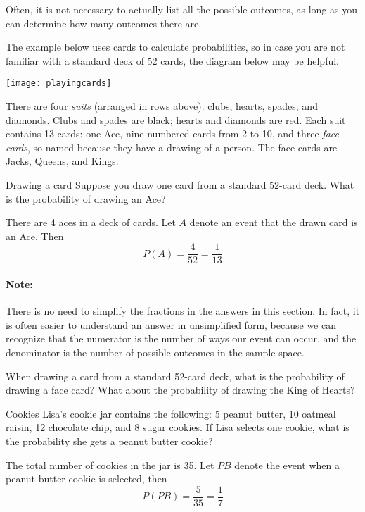 Often, it is not necessary to actually list all the possible outcomes, as long as you can determine how many outcomes there are.

The example below uses cards to calculate probabilities, so in case you are not familiar with a standard deck of 52 cards, the diagram below may be helpful. 

\begin{center}
\texttt{[image: playingcards]}
\end{center}

There are four \emph{suits} (arranged in rows above): clubs, hearts, spades, and diamonds.  Clubs and spades are black; hearts and diamonds are red.  Each suit contains 13 cards: one Ace, nine numbered cards from 2 to 10, and three \emph{face cards}, so named because they have a drawing of a person.  The face cards are Jacks, Queens, and Kings.

\begin{example}[https://www.youtube.com/watch?v=h_RyIlkgV2M&list=PLfmpjsIzhzts14-9s5QixRje97EI2oeMF&index=4]{Drawing a card}
Suppose you draw one card from a standard 52-card deck. What is the probability of drawing an Ace?

\sol
There are 4 aces in a deck of cards. Let $A$ denote an event that the drawn card is an Ace. Then
\[  P(A) = \boxed{\frac{4}{52}}  = \frac{1}{13} \]
\end{example}

\paragraph{Note:} There is no need to simplify the fractions in the answers in this section.  In fact, it is often easier to understand an answer in unsimplified form, because we can recognize that the numerator is the number of ways our event can occur, and the denominator is the number of possible outcomes in the sample space.

\begin{try}
When drawing a card from a standard 52-card deck, what is the probability of drawing a face card?  What about the probability of drawing the King of Hearts?
\end{try}

\begin{example}[https://www.youtube.com/watch?v=7DSjUMJHnTk&list=PLfmpjsIzhzts14-9s5QixRje97EI2oeMF&index=5]{Cookies}
Lisa's cookie jar contains the following: 5 peanut butter, 10 oatmeal raisin, 12 chocolate chip, and 8 sugar cookies. If Lisa selects one cookie, what is the probability she gets a peanut butter cookie? 

\sol
{} The total number of cookies in the jar is 35. Let $PB$ denote the event when a peanut butter cookie is selected, then
\[  P(PB) = \boxed{\frac{5}{35}} = \frac{1}{7} \]
\end{example}

